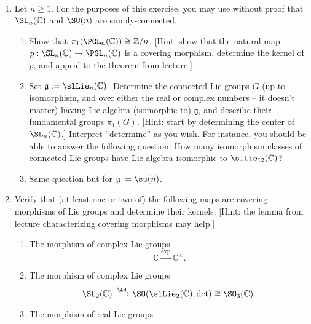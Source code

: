 \documentclass[reqno]{amsart} 
\begin{document}
\begin{homework}~\label{hw:universal-covering-group}
  \begin{enumerate}
  \item
    Let $n \geq 1$.
    For the purposes of this exercise,
    you may use without proof that $\SL_n(\mathbb{C})$
    and $\SU(n)$ are
    simply-connected.
    \begin{enumerate}
    \item 
      Show that $\pi_1(\PGL_n(\mathbb{C})) \cong \mathbb{Z}/n$.
      [Hint: show that the natural map $p : \SL_n(\mathbb{C}) \rightarrow
      \PGL_n(\mathbb{C})$
      is a covering morphism, determine the kernel of $p$,
      and appeal to the theorem from lecture.] 
    \item
      Set
      $\mathfrak{g} := \slLie_n(\mathbb{C})$.
      Determine the connected Lie groups $G$
      (up to isomorphism, and over either the real or complex numbers -- it doesn't matter)
      having Lie algebra (isomorphic to) $\mathfrak{g}$,
      and describe their fundamental groups $\pi_1(G)$.
      [Hint:
      start by determining the center of $\SL_n(\mathbb{C})$.]
      Interpret ``determine'' as you wish.  For instance, you should be able to answer the following question:
      How many isomorphism classes of connected Lie groups have
      Lie algebra isomorphic to $\slLie_{12}(\mathbb{C})$?
    \item
      Same question
      but for $\mathfrak{g} := \su(n)$.
    \end{enumerate}
  \item Verify that (at least one or two of)
    the following maps are covering morphisms of
    Lie groups and determine their kernels.
    [Hint: the lemma from lecture characterizing
    covering morphisms may help.]
    \begin{enumerate}
    \item The morphism of complex Lie groups
      \begin{equation*}
        \mathbb{C} \xrightarrow{\exp} \mathbb{C}^\times.
      \end{equation*}
    \item The morphism of complex Lie groups
      \begin{equation*}
        \SL_2(\mathbb{C}) \xrightarrow{\Ad}
        \SO(\slLie_2(\mathbb{C}),\det)
        \cong 
        \SO_3(\mathbb{C}).
      \end{equation*}
    \item The morphism of real Lie groups
      \begin{equation*}

\end{equation*}
\end{enumerate}
\end{enumerate}
\end{homework}
\end{document}

